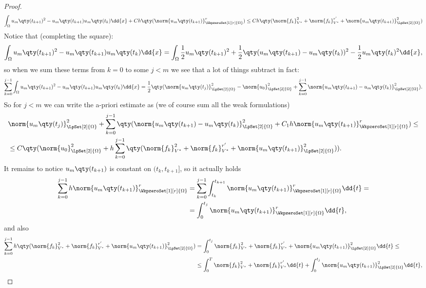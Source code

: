 \begin{proof}
	\begin{align*}
		\int_{\Omega}u_m\qty(t_{k+1})^{2} - u_m\qty(t_{k+1})u_m\qty(t_k)\dd{x} + Ch\qty(\norm{u_m\qty(t_{k+1})}_{\WkpzeroSet[1][r]{\Omega}}^r) \leq Ch\qty(\norm{f_k}_{V^{*}}^{2} + \norm{f_k}_{V^{*}}^{r'} + \norm{u_m\qty(t_{k+1})}_{\LpSet[2]{\Omega}}^{2}) 
	\end{align*}
	Notice that (completing the square):
	\[
		\int_{\Omega}u_m\qty(t_{k+1})^{2} - u_m\qty(t_{k+1})u_m\qty(t_k)\dd{x} = \int_{\Omega}\frac{1}{2}u_m\qty(t_{k+1})^{2} + \frac{1}{2}\qty(u_m\qty(t_{k+1})- u_m\qty(t_k))^{2} - \frac{1}{2} u_m\qty(t_k)^{2}\dd{x},
	\]
	so when we sum these terms from $k = 0$ to some $j < m$ we see that a lot of things subtract in fact:
	\[
		\sum_{k=0}^{j-1}\int_{\Omega}u_m\qty(t_{k+1})^{2} - u_m\qty(t_{k+1})u_m\qty(t_k)\dd{x} = \frac{1}{2}\qty(\norm{u_m\qty(t_j)}_{\LpSet[2]{\Omega}}^{2} - \norm{u_0}_{\LpSet[2]{\Omega}}^{2} + \sum_{k=0}^{j-1} \norm{u_m\qty(t_{k+1}) - u_m\qty(t_k)}_{\LpSet[2]{\Omega}}^{2}).
	\]
	So for $j < m$ we can write the a-priori estimate as (we of course sum all the weak formulations)
	\begin{align*}
		&\norm{u_m\qty(t_{j})}_{\LpSet[2]{\Omega}}^{2} + \sum_{k=0}^{j-1} \qty(\norm{u_m\qty(t_{k+1}) - u_m\qty(t_k)}_{\LpSet[2]{\Omega}}^{2} + C_1 h \norm{u_m\qty(t_{k+1})}_{\WkpzeroSet[1][r]{\Omega}}^r) \leq \\
		& \leq C\qty(\norm{u_0}_{\LpSet[2]{\Omega}}^{2} + h\sum_{k=0}^{j-1}\qty(\norm{f_k}_{V^{*}}^{2} + \norm{f_k}_{V^{*}}^{r'} + \norm{u_m\qty(t_{k+1})}_{\LpSet[2]{\Omega}}^{2})).
	\end{align*}
	It remains to notice $u_m\qty(t_{k+1})$ is constant on $(t_k, t_{k+1}]$, so it actually holds 
	\begin{align*}
		\sum_{k=0}^{j-1}h \norm{u_m\qty(t_{k+1})}_{\WkpzeroSet[1][r]{\Omega}}^r &= \sum_{k=0}^{j-1} \int_{t_k}^{t_{k+1}}\norm{u_m\qty(t_{k+1})}_{\WkpzeroSet[1][r]{\Omega}}^r\dd{t} = \\
											&= \int_{0}^{t_j}\norm{u_m\qty(t_{k+1})}_{\WkpzeroSet[1][r]{\Omega}}^r \dd{t}, 
	\end{align*}
	and also 
	\begin{align*}
		\sum_{k=0}^{j-1}h \qty(\norm{f_k}_{V^{*}}^{2} + \norm{f_k}_{V^{*}}^{r'} + \norm{u_m\qty(t_{k+1})}_{\LpSet[2]{\Omega}}^{2}) &= \int_0^{t_j}\norm{f_k}_{V^{*}}^{2} + \norm{f_k}_{V^{*}}^{r'} + \norm{u_m\qty(t_{k+1})}_{\LpSet[2]{\Omega}}^{2}\dd{t} \leq \\
																	   &\leq \int_0^{T}\norm{f_k}_{V^{*}}^{2} + \norm{f_k}_{V^{*}}^{r'}\dd{t} + \int_0^{t_j} \norm{u_m\qty(t_{k+1})}_{\LpSet[2]{\Omega}}^{2}\dd{t},

\end{align*}
\end{proof}
